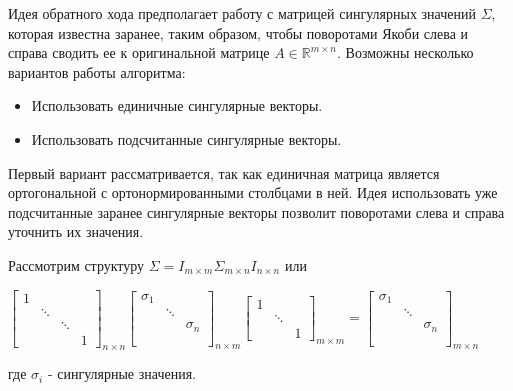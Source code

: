 Идея обратного хода предполагает работу с матрицей сингулярных значений $\Sigma$, которая известна заранее, таким образом, чтобы поворотами Якоби слева и справа сводить ее к оригинальной матрице $A \in \mathbb{R}^{m\times n}$. Возможны несколько вариантов работы алгоритма: 
\begin{itemize}
    \item Использовать единичные сингулярные векторы.
    \item Использовать подсчитанные сингулярные векторы.
\end{itemize}
Первый вариант рассматривается, так как единичная матрица является ортогональной с ортонормированными столбцами в ней. 
Идея использовать уже подсчитанные заранее сингулярные векторы позволит поворотами слева и справа уточнить их значения. 

Рассмотрим структуру $\Sigma = I_{m\times m}\Sigma_{m\times n}I_{n\times n}$ или

\begin{center}
    $\begin{bmatrix}
        1 & & & \\
         & \ddots & & \\
         & & \ddots & \\
         & & & 1
    \end{bmatrix}_{n \times n}
    \begin{bmatrix}
        \sigma_1 & & \\
         & \ddots & \\
         & & \sigma_n \\
         & & \\
         & & 
    \end{bmatrix}_{n \times m}
    \begin{bmatrix}
        1 & & \\
         & \ddots & \\
         & & 1
    \end{bmatrix}_{m \times m}
    =
    \begin{bmatrix}
        \sigma_1 & & \\
         & \ddots & \\
         & & \sigma_n \\
         & & \\
         & & 
    \end{bmatrix}_{m \times n}$
    
    \vspace{1em} 
    где $\sigma_i$ - сингулярные значения.
\end{center}

